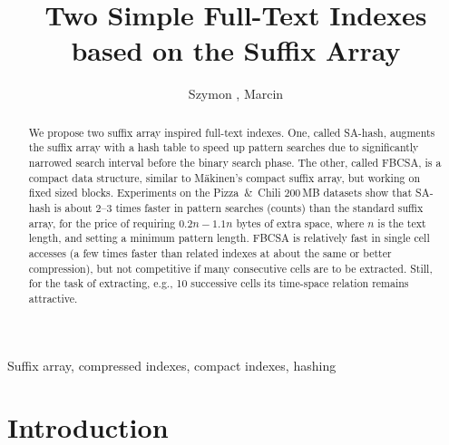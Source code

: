 \documentclass{cai}
\begin{document}
\label{firstpage}

\title[Two simple full-text indexes based on the suffix array]
      {Two Simple Full-Text Indexes\\ based on the Suffix Array}

\author[Sz.~Grabowski, M.~Raniszewski]
       {Szymon , Marcin }





\noreceived{} \nocommunicated{}

\maketitle

\begin{abstract}
We propose two suffix array inspired full-text indexes.
One, called SA-hash, augments the suffix array with a hash table 
to speed up pattern searches due to significantly narrowed search 
interval before the binary search phase.
The other, called FBCSA, is a compact data structure, similar to
M{\"a}kinen's compact suffix array, but working on fixed sized blocks.
Experiments 
on the Pizza~\&~Chili 200\,MB datasets 
show that SA-hash is about 2--3 times faster in pattern searches (counts) 
than the standard suffix array, for the price of requiring $0.2n-1.1n$ 
bytes of extra space, where $n$ is the text length, and setting a 
minimum pattern length.
FBCSA is relatively fast in single cell accesses (a few times faster 
than related indexes at about the same or better compression), 
but not competitive if many consecutive cells are to be extracted. 
Still, for the task of extracting, e.g., 10 successive cells its time-space 
relation remains attractive.
\end{abstract}

\begin{keywords}
Suffix array, compressed indexes, compact indexes, hashing
\end{keywords}



\section{Introduction}
\end{document}
